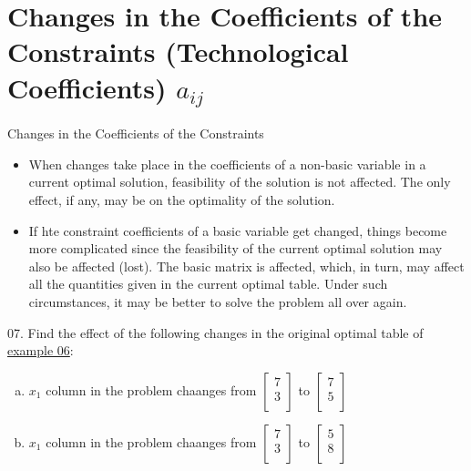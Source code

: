 
\section{Changes in the Coefficients of the Constraints (Technological Coefficients) $a_{ij}$}

\begin{frame}{Changes in the Coefficients of the Constraints}{}
  \begin{itemize} \justifying \parskip5mm
  \item When changes take place in the coefficients of a \alert{non-basic variable} in a current optimal solution, feasibility of the solution is not affected. The only effect, if any, may be on the optimality of the solution.
  \item If hte constraint coefficients of a \alert{basic variable} get changed, things become more complicated since the feasibility of the current optimal solution may also be affected (lost). \alert{The basic matrix is affected}, which, in turn, may affect all the quantities given in the current optimal table. Under such circumstances, \alert{it may be better to solve the problem all over again}.
  \end{itemize}
\end{frame}

\begin{frameExample}{07.}{}
  Find the effect of the following changes in the original optimal table of \hyperlink{example06}{example 06}:

  \begin{enumerate}[a)] \justifying \parskip4mm
  \item $x_1$ column in the problem chaanges from %
    $
    \begin{bmatrix}
      7\\3\\
    \end{bmatrix}
    $ to %
    $
    \begin{bmatrix}
      7\\5\\
    \end{bmatrix}
    $
  \item $x_1$ column in the problem chaanges from %
    $
    \begin{bmatrix}
      7\\3\\
    \end{bmatrix}
    $ to %
    $
    \begin{bmatrix}
      5\\8\\
    \end{bmatrix}
    $
  \end{enumerate}
\end{frameExample}



